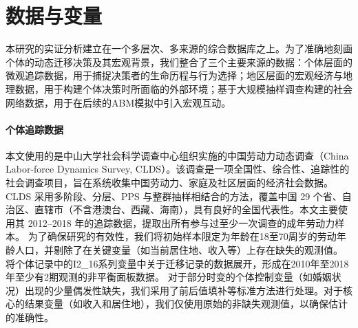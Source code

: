 \documentclass[
  a4paper,
  zihao=-4,
  fontset=mac,
  AutoFakeBold,
  AutoFakeSlant,
  oneside]{ctexbook}
\begin{document}
\section{数据与变量}

本研究的实证分析建立在一个多层次、多来源的综合数据库之上。为了准确地刻画个体的动态迁移决策及其宏观背景，我们整合了三个主要来源的数据：个体层面的微观追踪数据，用于捕捉决策者的生命历程与行为选择；地区层面的宏观经济与地理数据，用于构建个体决策时所面临的外部环境；基于大规模抽样调查构建的社会网络数据，用于在后续的ABM模拟中引入宏观互动。

\paragraph{个体追踪数据}

本文使用的是中山大学社会科学调查中心组织实施的中国劳动力动态调查（China Labor-force Dynamics Survey, CLDS）。该调查是一项全国性、综合性、追踪性的社会调查项目，旨在系统收集中国劳动力、家庭及社区层面的经济社会数据。CLDS 采用多阶段、分层、PPS 与整群抽样相结合的方法，覆盖中国 29 个省、自治区、直辖市（不含港澳台、西藏、海南），具有良好的全国代表性。本文主要使用其 2012–2018 年的追踪数据，提取出所有参与过至少一次调查的成年劳动力样本。
为了确保研究的有效性，我们将初始样本限定为年龄在18至70周岁的劳动年龄人口，并剔除了在关键变量（如当前居住地、收入等）上存在缺失的观测值。
将个体记录中的I2\_16系列变量中关于迁移记录的数据展开，形成在2010年至2018年至少有2期观测的非平衡面板数据。
对于部分时变的个体控制变量（如婚姻状况）出现的少量偶发性缺失，我们采用了前后值填补等标准方法进行处理。对于核心的结果变量（如收入和居住地），我们仅使用原始的非缺失观测值，以确保估计的准确性。
\end{document}
